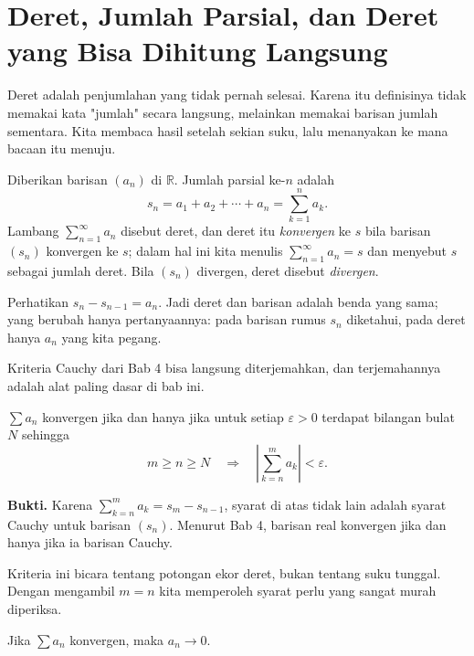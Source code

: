 \section{Deret, Jumlah Parsial, dan Deret yang Bisa Dihitung Langsung}

Deret adalah penjumlahan yang tidak pernah selesai. Karena itu
definisinya tidak memakai kata "jumlah" secara langsung, melainkan memakai barisan
jumlah sementara.
Kita membaca hasil setelah sekian suku, lalu menanyakan ke mana bacaan itu menuju.

\begin{definisi}
Diberikan barisan $(a_n)$ di $\mathbb{R}$. Jumlah parsial ke-$n$ adalah
\[
  s_n = a_1 + a_2 + \cdots + a_n = \sum_{k=1}^{n} a_k .
\]
Lambang $\sum_{n=1}^{\infty} a_n$ disebut deret, dan deret itu \emph{konvergen} ke
$s$ bila barisan $(s_n)$ konvergen ke $s$; dalam hal ini kita menulis
$\sum_{n=1}^{\infty} a_n = s$ dan menyebut $s$ sebagai jumlah deret. Bila $(s_n)$
divergen, deret disebut \emph{divergen}.
\end{definisi}


Perhatikan $s_n - s_{n-1} = a_n$. Jadi deret dan barisan adalah benda yang sama; yang
berubah hanya pertanyaannya: pada barisan rumus $s_n$ diketahui, pada deret hanya $a_n$
yang kita pegang.

Kriteria Cauchy dari Bab 4 bisa langsung diterjemahkan, dan terjemahannya adalah alat
paling dasar di bab ini.

\begin{teorema}
$\sum a_n$ konvergen jika dan hanya jika untuk setiap $\varepsilon > 0$ terdapat
bilangan bulat $N$ sehingga
\[
  m \ge n \ge N \quad \Longrightarrow \quad
  \left| \sum_{k=n}^{m} a_k \right| < \varepsilon .
\]
\end{teorema}

\noindent\textbf{Bukti.} Karena $\sum_{k=n}^{m} a_k = s_m - s_{n-1}$, syarat di atas tidak lain adalah syarat
Cauchy untuk barisan $(s_n)$. Menurut Bab 4, barisan real konvergen jika dan hanya
jika ia barisan Cauchy.

Kriteria ini bicara tentang potongan ekor deret, bukan tentang suku tunggal. Dengan
mengambil $m = n$ kita memperoleh syarat perlu yang sangat murah diperiksa.

\begin{akibat}
Jika $\sum a_n$ konvergen, maka $a_n \to 0$.
\end{akibat}

